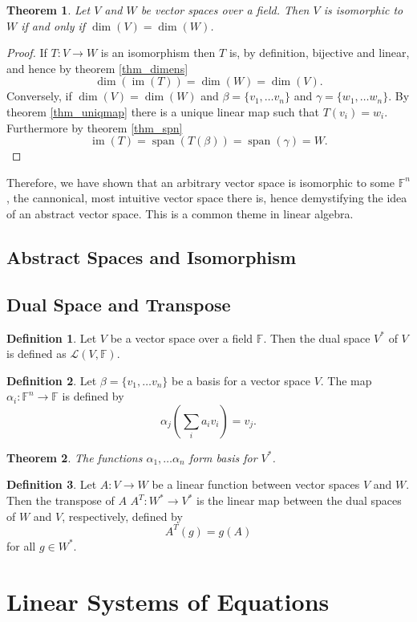 \documentclass[oneside, 12pt]{book}
\DeclareMathOperator{\spn}{span}
\DeclareMathOperator{\im}{im}
\newtheorem{thm}{Theorem}[section]
\theoremstyle{definition}
\newtheorem{defn}{Definition}[section]
\begin{document}
\begin{thm}
  \label{thm_iso}
  Let $V$ and $W$ be vector spaces over a field. Then $V$ is isomorphic to $W$ if and only if $\dim(V)=\dim(W)$.
\end{thm}
\begin{proof}
  If $T:V \to W$ is an isomorphism then $T$ is, by definition, bijective and linear, and hence by theorem \ref{thm_dimens}
  \[\dim(\im(T))=\dim(W)=\dim(V).\] Conversely, if $\dim(V)=\dim(W)$ and $\beta=\{v_{1}, \dots v_{n}\}$ and $\gamma =\{w_{1}, \dots w_{n}\}$. By theorem \ref{thm_uniqmap} there is a unique linear map such that $T(v_{i})=w_{i}$. Furthermore by theorem \ref{thm_spn} \[\im(T)=\spn(T(\beta))=\spn(\gamma)=W.\]
\end{proof}
Therefore, we have shown that an arbitrary vector space is isomorphic to some $\mathbb{F}^{n}$, the cannonical, most intuitive vector space there is, hence demystifying the idea of an abstract vector space. This is a common theme in linear algebra.
\section{Abstract Spaces and Isomorphism}
\section{Dual Space and Transpose}
\begin{defn}
  Let $V$ be a vector space over a field $\mathbb{F}$. Then the dual space $V^{*}$ of $V$ is defined as $\mathcal{L}(V,\mathbb{F})$.
\end{defn}
\begin{defn}
Let $\beta=\{v_{1}, \dots v_{n}\}$ be a basis for a vector space $V$.
The map $\alpha_{i}: \mathbb{F}^{n} \to \mathbb{F}$ is defined by \[\alpha_{j}(\sum_{i}a_{i}v_{i})=v_{j}.\]
\end{defn}
\begin{thm}
  \label{thm_dualbase}
  The functions $\alpha_{1}, \dots \alpha_{n}$ form basis for $V^{*}$.
\end{thm}
\begin{defn}
  \label{defn_transp}
Let $A: V \to W$ be a linear function between vector spaces $V$ and $W$. Then the transpose of $A$ $A^{T}:W^{*}\to V^{*}$ is the linear map between the dual spaces of $W$ and $V$, respectively, defined by \[A^{T}(g)=g(A)\] for all $g \in W^{*}$.
\end{defn}
\chapter{Linear Systems of Equations}
\end{document}

